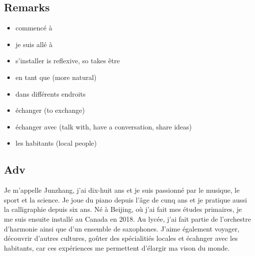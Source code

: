 \documentclass{book}
\begin{document}
    \subsection{Remarks}
        \begin{itemize}
            \item commencé à
            \item je suis allé à
            \item s'installer is reflexive, so takes être
            \item en tant que (more natural)
            \item dans différents endroits
            \item échanger (to exchange)
            \item échanger avec (talk with, have a conversation, share ideas)
            \item les habitants (local people)
        \end{itemize}

    \subsection{Adv}
        Je m'appelle Junzhang, j'ai dix-huit ans et je suis passionné par le musique, le sport et la science.
        Je joue du piano depuis l'âge de cunq ans et je pratique aussi la calligraphie depuis six ans.
        Né à Beijing, où j'ai fait mes études primaires, je me suis ensuite installé au Canada en 2018.
        Au lycée, j'ai fait partie de l'orchestre d'harmonie ainsi que d'un ensemble de saxophones.
        J'aime également voyager, découvrir d'autres cultures, goûter des spécialitiés locales et écahnger avec les habitants,
        car ces expériences me permettent d'élargir ma vison du monde.
\end{document}
